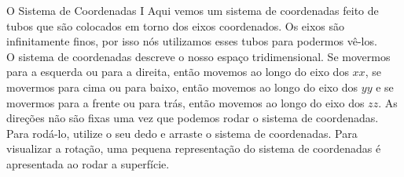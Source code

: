\begin{surferPage}[As Coordenadas I]{O Sistema de Coordenadas I}
Aqui  vemos um sistema de coordenadas feito de tubos que s\~ao colocados em torno dos eixos coordenados. Os eixos s\~ao infinitamente finos, por isso n\'os utilizamos esses tubos para podermos v\^e-los.\\
O sistema de coordenadas descreve o nosso espa\c co tridimensional. Se movermos para a esquerda ou para a direita, ent\~ao  movemos ao longo do eixo dos $xx$, se  movermos para cima ou para baixo, ent\~ao  movemos ao longo do eixo dos $yy$ e se  movermos para a frente ou para tr\'as, ent\~ao  movemos ao longo do eixo dos $zz$. As dire\c c\~oes n\~ao s\~ao fixas uma vez que podemos rodar o sistema de coordenadas.\\
\vspace{0.3cm}
Para rod\'a-lo, utilize o seu dedo e arraste o sistema de coordenadas. Para visualizar a rota\c c\~ao, uma pequena representa\c c\~ao do sistema de coordenadas \'e apresentada ao rodar a superf\'icie.
\end{surferPage}
